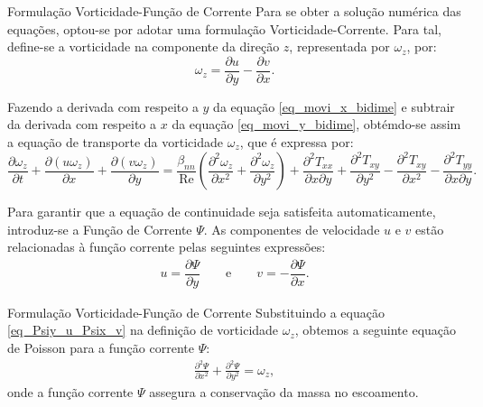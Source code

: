 \begin{frame}{Formulação Vorticidade-Função de Corrente}
Para se obter a solução numérica das equações, optou-se por adotar uma formulação Vorticidade-Corrente. Para tal, define-se a vorticidade na componente da direção $z$, representada por $\omega_{z}$, por:
\begin{equation}
    \omega_{z} = \dfrac{\partial u}{\partial y} - \dfrac{\partial v}{\partial x}.
\end{equation}

Fazendo a derivada com respeito a $y$ da equação \ref{eq_movi_x_bidime} e subtrair da derivada com respeito a $x$ da equação \ref{eq_movi_y_bidime}, obtémdo-se assim a equação de transporte da vorticidade $\omega_z$, que é expressa por:
\begin{equation}
    \dfrac{\partial \omega_{z}}{\partial t}+\dfrac{\partial(u\omega_{z})}{\partial x}+\dfrac{\partial(v\omega_{z})}{\partial y} = \dfrac{\beta_{nn}}{\operatorname{Re}}\left( \dfrac{\partial^{2}\omega_{z}}{\partial x^{2}} + \dfrac{\partial^{2}\omega_{z}}{\partial y^{2}} \right)+\dfrac{\partial^{2}T_{xx}}{\partial x\partial y}+\dfrac{\partial^{2}T_{xy}}{\partial y^{2}}-\dfrac{\partial^{2}T_{xy}}{\partial x^{2}}-\dfrac{\partial^{2}T_{yy}}{\partial x\partial y}.\label{eq_vorticity_wz}
\end{equation}

Para garantir que a equação de continuidade seja satisfeita automaticamente, introduz-se a Função de Corrente $\Psi$. As componentes de velocidade $u$ e $v$ estão relacionadas à função corrente pelas seguintes expressões:
\begin{align}\label{eq_Psiy_u_Psix_v}
    u = \dfrac{\partial \Psi}{\partial y} \qquad \textrm{e} \qquad v = - \dfrac{\partial \Psi}{\partial x}.
\end{align}
\end{frame}

\begin{frame}{Formulação Vorticidade-Função de Corrente}
Substituindo a equação \autoref{eq_Psiy_u_Psix_v}  na definição de vorticidade \(\omega_z\), obtemos a seguinte equação de Poisson para a função corrente \(\Psi\):
\begin{align}\label{eq_psi_vortic_corrent}
    \frac{\partial^2 \Psi}{\partial x^2}+\frac{\partial^2 \Psi}{\partial y^2}= \omega_z,
\end{align}
onde a função corrente $\Psi$ assegura a conservação da massa no escoamento.
\end{frame}